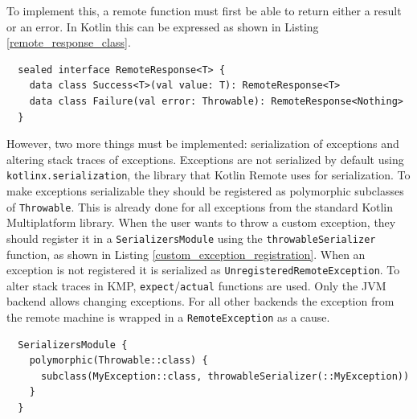 \documentclass[a4paper,11pt,oneside]{article}
\newcommand{\kotlini}[1]{\texttt{#1}}
\begin{document}
To implement this, a remote function must first be able to return either a result or an error. In Kotlin
this can be expressed as shown in Listing \ref{remote_response_class}.

\begin{listing}[!h]
  \begin{verbatim}
  sealed interface RemoteResponse<T> {
    data class Success<T>(val value: T): RemoteResponse<T>
    data class Failure(val error: Throwable): RemoteResponse<Nothing>
  }
  \end{verbatim}
  \caption{Return type of remote functions}\label{remote_response_class}
\end{listing}

However, two more things must be implemented: serialization of exceptions and altering stack traces
of exceptions. Exceptions are not serialized by default using \texttt{kotlinx.serialization}, the library that Kotlin Remote uses
for serialization. To make exceptions serializable they should be registered as polymorphic subclasses
of \kotlini{Throwable}. This is already done for all exceptions from the standard Kotlin Multiplatform library.
When the user wants to throw a custom exception, they should register it in a \kotlini{SerializersModule} using
the \kotlini{throwableSerializer} function, as shown in Listing \ref{custom_exception_registration}.
When an exception is not registered it is serialized as \kotlini{UnregisteredRemoteException}.
To alter stack traces in KMP, \kotlini{expect}/\kotlini{actual} functions are used. Only the JVM backend allows
changing exceptions. For all other backends the exception from the remote machine is wrapped in a
\kotlini{RemoteException} as a cause.

\begin{listing}[!h]
  \begin{verbatim}
  SerializersModule {
    polymorphic(Throwable::class) {
      subclass(MyException::class, throwableSerializer(::MyException))
    }
  }
  \end{verbatim}
  \caption{Custom exception registration}\label{custom_exception_registration}
\end{listing}
\end{document}
